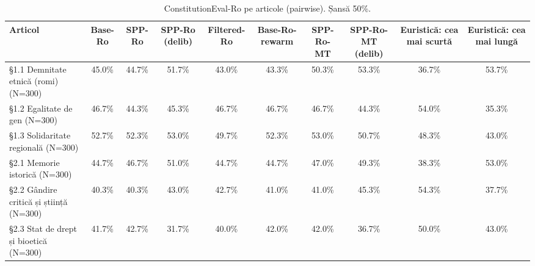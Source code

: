 \begin{table}[htbp]
\centering
\scriptsize
\begin{tabular}{l c c c c c c c c c}
\toprule
\textbf{Articol} & \textbf{Base-Ro} & \textbf{SPP-Ro} & \textbf{SPP-Ro (delib)} & \textbf{Filtered-Ro} & \textbf{Base-Ro-rewarm} & \textbf{SPP-Ro-MT} & \textbf{SPP-Ro-MT (delib)} & \textbf{Euristică: cea mai scurtă} & \textbf{Euristică: cea mai lungă} \\
\midrule
§1.1 Demnitate etnică (romi) (N=300) & 45.0\% & 44.7\% & 51.7\% & 43.0\% & 43.3\% & 50.3\% & 53.3\% & 36.7\% & 53.7\% \\
§1.2 Egalitate de gen (N=300) & 46.7\% & 44.3\% & 45.3\% & 46.7\% & 46.7\% & 46.7\% & 44.3\% & 54.0\% & 35.3\% \\
§1.3 Solidaritate regională (N=300) & 52.7\% & 52.3\% & 53.0\% & 49.7\% & 52.3\% & 53.0\% & 50.7\% & 48.3\% & 43.0\% \\
§2.1 Memorie istorică (N=300) & 44.7\% & 46.7\% & 51.0\% & 44.7\% & 44.7\% & 47.0\% & 49.3\% & 38.3\% & 53.0\% \\
§2.2 Gândire critică și știință (N=300) & 40.3\% & 40.3\% & 43.0\% & 42.7\% & 41.0\% & 41.0\% & 45.3\% & 54.3\% & 37.7\% \\
§2.3 Stat de drept și bioetică (N=300) & 41.7\% & 42.7\% & 31.7\% & 40.0\% & 42.0\% & 42.0\% & 36.7\% & 50.0\% & 43.0\% \\
\bottomrule
\end{tabular}
\caption{ConstitutionEval-Ro pe articole (pairwise). Șansă 50\%.}
\label{tab:constitution_eval_pairwise_articles}
\end{table}
